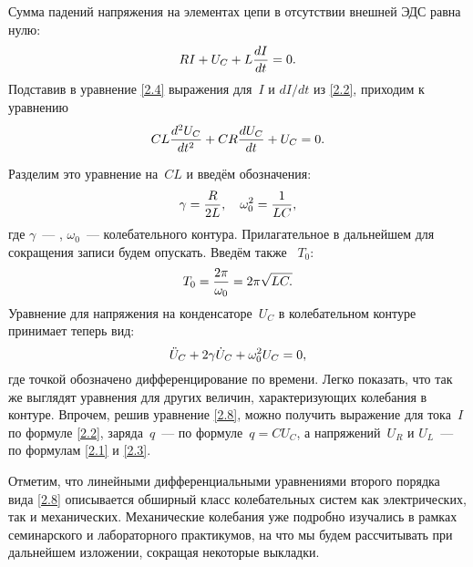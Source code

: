 \documentclass[a4paper,oneside]{book}
\begin{document}
Сумма падений напряжения на элементах цепи в отсутствии внешней ЭДС равна нулю:
\begin{equation}
	\eqmark{2.4}
	RI+U_C+L\dfrac{dI}{dt}=0.
\end{equation}
Подставив в уравнение \eqref{2.4} выражения для~$I$ и $dI/dt$ из \eqref{2.2},
приходим к уравнению
\begin{equation}
	\eqmark{2.5}
	CL\dfrac{d^2U_C}{dt^2}+CR\dfrac{dU_C}{dt}+U_C=0.
\end{equation}

Разделим это уравнение на~$CL$ и введём обозначения:
\begin{equation}\eqmark{2.6}
\gamma=\dfrac{R}{2L},~~~\omega_0^2=\dfrac{1}{LC},
\end{equation}
где $\gamma$~--- ,
$\omega_0$~---  колебательного контура.
Прилагательное   в дальнейшем для сокращения записи
будем опускать. Введём также  ~$T_0$:
\begin{equation}\eqmark{2.7}
T_0=\dfrac{2\pi}{\omega_0}=2\pi\sqrt{LC.}
\end{equation}
Уравнение для напряжения на конденсаторе~$U_C$ в колебательном контуре принимает
теперь вид:
\begin{equation}\eqmark{2.8}
\ddot{U}_C+2\gamma\dot{U}_C+\omega_0^2U_C=0,
\end{equation}
где точкой обозначено дифференцирование по времени. Легко показать, что так же
выглядят уравнения для других величин, характеризующих колебания в контуре.
Впрочем, решив уравнение \eqref{2.8}, можно получить выражение для тока~$I$ по
формуле \eqref{2.2}, заряда~$q$~--- по формуле~$q=CU_C$, а напряжений~$U_R$ и
$U_L$~--- по формулам \eqref{2.1} и \eqref{2.3}.

Отметим, что линейными дифференциальными уравнениями второго порядка вида
\eqref{2.8} описывается обширный класс колебательных систем как электрических,
так и механических. Механические колебания уже подробно изучались в рамках
семинарского и лабораторного практикумов, на что мы будем рассчитывать при
дальнейшем изложении, сокращая некоторые выкладки.
\end{document}
